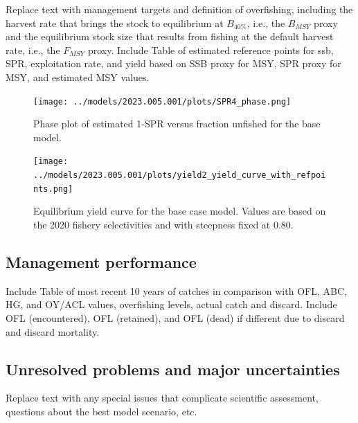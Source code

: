 \documentclass[11pt,
  english,
  letterpaper,
]{article}
\begin{document}
Replace text with management targets and definition of overfishing, including the harvest rate that brings the stock to equilibrium at \(B_{40\%}\), i.e., the \(B_{MSY}\) proxy and the equilibrium stock size that results from fishing at the default harvest rate, i.e., the \(F_{MSY}\) proxy. Include Table of estimated reference points for ssb, SPR, exploitation rate, and yield based on SSB proxy for MSY, SPR proxy for MSY, and estimated MSY values.

\begin{figure}
\centering
\texttt{[image: ../models/2023.005.001/plots/SPR4\_phase.png]}
\caption{Phase plot of estimated 1-SPR versus fraction unfished for the base model.\label{fig:es-phase}}
\end{figure}

\begin{figure}
\centering
\texttt{[image: ../models/2023.005.001/plots/yield2\_yield\_curve\_with\_refpoints.png]}
\caption{Equilibrium yield curve for the base case model. Values are based on the 2020 fishery selectivities and with steepness fixed at 0.80.\label{fig:es-yield}}
\end{figure}



\clearpage

\hypertarget{management-performance}{%
\subsection*{Management performance}\label{management-performance}}

Include Table of most recent 10 years of catches in comparison with OFL, ABC, HG, and OY/ACL values, overfishing levels, actual catch and discard. Include OFL (encountered), OFL (retained), and OFL (dead) if different due to discard and discard mortality.

\hypertarget{unresolved-problems-and-major-uncertainties}{%
\subsection*{Unresolved problems and major uncertainties}\label{unresolved-problems-and-major-uncertainties}}

Replace text with any special issues that complicate scientific assessment, questions about the best model scenario, etc.
\end{document}
